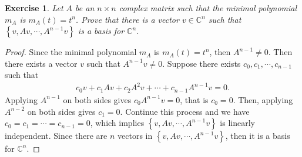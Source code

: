 \documentclass[11pt]{article}
\newtheorem{exercise}{Exercise}[section]
\theoremstyle{definition}
\numberwithin{equation}{subsection}
\begin{document}
\newpage
\begin{exercise}
Let $A$ be an $n \times n$ complex matrix such that the minimal polynomial $m_A$ is $m_A(t) = t^n$. Prove that there is a vector $v \in \mathbb{C}^n$ such that $\left\{v, Av, \cdots, A^{n-1}v\right\}$ is a basis for $\mathbb{C}^n$.
\end{exercise}
\begin{proof}
Since the minimal polynomial $m_A$ is $m_A(t) = t^n$, then $A^{n-1} \neq 0$. Then there exists a vector $v$ such that $A^{n-1}v \neq 0$. Suppose there exists $c_0, c_1, \cdots, c_{n-1}$ such that
\begin{align*}
    c_0 v + c_1 Av + c_2 A^2v + \cdots + c_{n-1} A^{n-1}v = 0.
\end{align*}
Applying $A^{n-1}$ on both sides gives $c_0 A^{n-1}v = 0$, that is $c_0 = 0$. Then, applying $A^{n-2}$ on both sides gives $c_1 = 0$. Continue this process and we have $c_0 = c_1 = \cdots = c_{n-1} = 0$, which implies $\left\{v, Av, \cdots, A^{n-1}v\right\}$ is linearly independent. Since there are $n$ vectors in $\left\{v, Av, \cdots, A^{n-1}v\right\}$, then it is a basis for $\mathbb{C}^n$.
\end{proof}

\medskip
\end{document}
